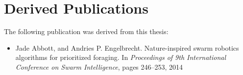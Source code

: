
\chapter{Derived Publications}
\label{app:derived_publications}

The following publication was derived from this thesis:
\begin{itemize}
	\item Jade Abbott, and Andries P. Engelbrecht. Nature-inspired swarm robotics algorithms for prioritized foraging. In \textit{Proceedings of 9th International Conference on Swarm Intelligence}, pages 246--253, 2014
\end{itemize}

